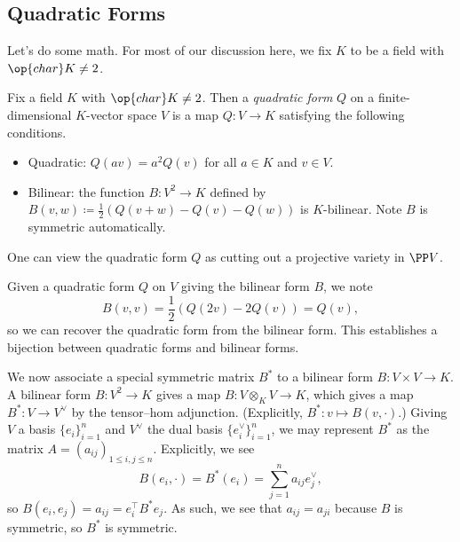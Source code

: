 \documentclass[../notes.tex]{subfiles}
\begin{document}
\subsection{Quadratic Forms}
Let's do some math. For most of our discussion here, we fix $K$ to be a field with $\op{char}K\ne2$.
\begin{definition}
	Fix a field $K$ with $\op{char}K\ne2$. Then a \textit{quadratic form} $Q$ on a finite-dimensional $K$-vector space $V$ is a map $Q\colon V\to K$ satisfying the following conditions.
	\begin{itemize}
		\item Quadratic: $Q(av)=a^2Q(v)$ for all $a\in K$ and $v\in V$.
		\item Bilinear: the function $B\colon V^2\to K$ defined by $B(v,w)\coloneqq\frac12(Q(v+w)-Q(v)-Q(w))$ is $K$-bilinear. Note $B$ is symmetric automatically.
	\end{itemize}
\end{definition}
\begin{remark}
	One can view the quadratic form $Q$ as cutting out a projective variety in $\PP V$.
\end{remark}
\begin{remark}
	Given a quadratic form $Q$ on $V$ giving the bilinear form $B$, we note
	\[B(v,v)=\frac12(Q(2v)-2Q(v))=Q(v),\]
	so we can recover the quadratic form from the bilinear form. This establishes a bijection between quadratic forms and bilinear forms.
\end{remark}
We now associate a special symmetric matrix $B^*$ to a bilinear form $B\colon V\times V\to K$. A bilinear form $B\colon V^2\to K$ gives a map $B\colon V\otimes_KV\to K$, which gives a map $B^*\colon V\to V^\lor$ by the tensor--hom adjunction. (Explicitly, $B^*\colon v\mapsto B(v,\cdot)$.) Giving $V$ a basis $\{e_i\}_{i=1}^n$ and $V^\lor$ the dual basis $\{e_i^\lor\}_{i=1}^n$, we may represent $B^*$ as the matrix $A=(a_{ij})_{1\le i,j\le n}$. Explicitly, we see
\[B(e_i,\cdot)=B^*(e_i)=\sum_{j=1}^na_{ij}e_j^\lor,\]
so $B(e_i,e_j)=a_{ij}=e_i^\intercal B^*e_j$. As such, we see that $a_{ij}=a_{ji}$ because $B$ is symmetric, so $B^*$ is symmetric.
\end{document}
